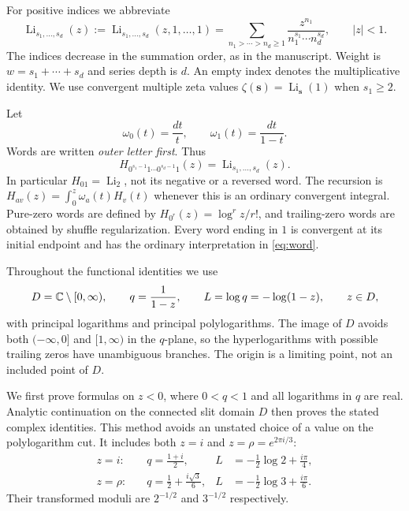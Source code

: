 \documentclass[11pt]{article}
\numberwithin{equation}{section}
\theoremstyle{definition}\newtheorem{definition}[theorem]{Definition}
\theoremstyle{remark}\newtheorem{remark}[theorem]{Remark}
\DeclareMathOperator{\Li}{Li}
\begin{document}
For positive indices we abbreviate
\begin{equation}\label{eq:mpl}
\Li_{s_1,\ldots,s_d}(z)
 :=\Li_{s_1,\ldots,s_d}(z,1,\ldots,1)
 =\sum_{n_1>\cdots>n_d\ge1}
 \frac{z^{n_1}}{n_1^{s_1}\cdots n_d^{s_d}},\qquad |z|<1.
\end{equation}
The indices decrease in the summation order, as in the manuscript.
Weight is $w=s_1+\cdots+s_d$ and series depth is $d$.
An empty index denotes the multiplicative identity.
We use convergent multiple zeta values
$\zeta(\boldsymbol s)=\Li_{\boldsymbol s}(1)$ when $s_1\ge2$.

Let
\[
 \omega_0(t)=\frac{dt}{t},\qquad
 \omega_1(t)=\frac{dt}{1-t}.
\]
Words are written \emph{outer letter first}. Thus
\begin{equation}\label{eq:word}
H_{0^{s_1-1}1\cdots0^{s_d-1}1}(z)=\Li_{s_1,\ldots,s_d}(z).
\end{equation}
In particular $H_{01}=\Li_2$, not its negative or a reversed word.
The recursion is
$H_{av}(z)=\int_0^z\omega_a(t)H_v(t)$ whenever this is an ordinary
convergent integral. Pure-zero words are defined by
$H_{0^r}(z)=\log^r z/r!$, and trailing-zero words are obtained by shuffle
regularization. Every word ending in $1$ is convergent at its initial
endpoint and has the ordinary interpretation in \eqref{eq:word}.

Throughout the functional identities we use
\begin{equation}\label{eq:domain}
 D=\mathbb C\setminus[0,\infty),\qquad
 q=\frac1{1-z},\qquad L=\log q=-\log(1-z),\qquad z\in D,
\end{equation}
with principal logarithms and principal polylogarithms. The image of $D$
avoids both $(-\infty,0]$ and $[1,\infty)$ in the $q$-plane, so the
hyperlogarithms with possible trailing zeros have unambiguous branches.
The origin is a limiting point, not an included point of $D$.

We first prove formulas on $z<0$, where $0<q<1$ and all logarithms in
$q$ are real. Analytic continuation on the connected slit domain $D$
then proves the stated complex identities. This method avoids an
unstated choice of a value on the polylogarithm cut. It includes both
$z=i$ and $z=\rho=e^{2\pi i/3}$:
\begin{align}
 z=i:&\quad q=\frac{1+i}{2},&L&=-\frac12\log2+\frac{i\pi}{4},\label{eq:gausspoint}\\
 z=\rho:&\quad q=\frac12+\frac{i\sqrt3}{6},&L&=-\frac12\log3+\frac{i\pi}{6}.\label{eq:eispoint}
\end{align}
Their transformed moduli are $2^{-1/2}$ and $3^{-1/2}$ respectively.
\end{document}
